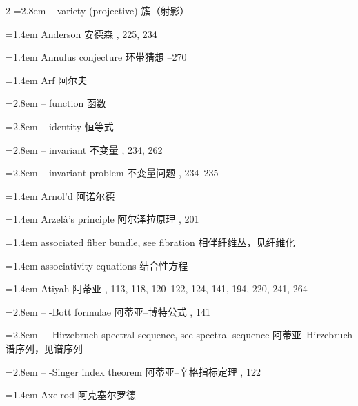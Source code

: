 \begin{multicols}{2}
\noindent\hangindent=2.8em -- variety (projective) \quad 簇（射影） \par
\noindent\hangindent=1.4em Anderson \quad 安德森 , 225, 234\par
\noindent\hangindent=1.4em Annulus conjecture \quad 环带猜想 --270\par
\noindent\hangindent=1.4em Arf \quad 阿尔夫 \quad\par
\noindent\hangindent=2.8em -- function \quad 函数 \par
\noindent\hangindent=2.8em -- identity \quad 恒等式 \par
\noindent\hangindent=2.8em -- invariant \quad 不变量 , 234, 262\par
\noindent\hangindent=2.8em -- invariant problem \quad 不变量问题 , 234--235\par
\noindent\hangindent=1.4em Arnol'd \quad 阿诺尔德 \par
\noindent\hangindent=1.4em Arzel\`a's principle \quad 阿尔泽拉原理 , 201\par
\noindent\hangindent=1.4em associated fiber bundle, see fibration \quad 相伴纤维丛，见纤维化 \quad\par
\noindent\hangindent=1.4em associativity equations \quad 结合性方程 \par
\noindent\hangindent=1.4em Atiyah \quad 阿蒂亚 , 113, 118, 120--122, 124, 141, 194, 220, 241, 264\par
\noindent\hangindent=2.8em -- -Bott formulae \quad 阿蒂亚--博特公式 , 141\par
\noindent\hangindent=2.8em -- -Hirzebruch spectral sequence, see spectral sequence \quad 阿蒂亚--Hirzebruch 谱序列，见谱序列 \quad\par
\noindent\hangindent=2.8em -- -Singer index theorem \quad 阿蒂亚--辛格指标定理 , 122\par
\noindent\hangindent=1.4em Axelrod \quad 阿克塞尔罗德 \par
\end{multicols}

